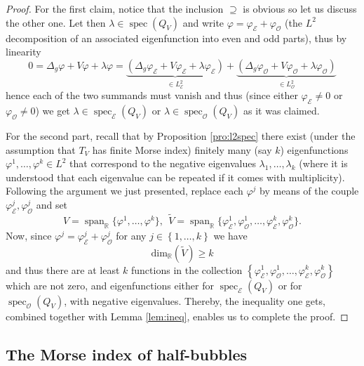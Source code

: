 \documentclass[10pt]{amsart}
\let\mathcal\mathscr
\DeclareMathOperator{\Span}{span}
\DeclareMathOperator{\spec}{spec}
\theoremstyle{definition}
\newcommand{\R}{\mathbb{R}}
\begin{document}
\begin{proof}
For the first claim, notice that the inclusion $\supseteq$ is obvious so let us discuss the other one. Let then $\lambda \in \spec(Q_V)$ and write $\varphi=\varphi_{\mathcal{E}}+\varphi_{\mathcal{O}}$ (the $L^2$ decomposition of an associated eigenfunction into even and odd parts), thus by linearity
\[
0=\Delta_g \varphi+V\varphi+\lambda\varphi= \underbrace{(\Delta_g \varphi_{\mathcal{E}}+V\varphi_{\mathcal{E}}+\lambda\varphi_{\mathcal{E}})}_{\in L^2_{\mathcal{E}} } + \underbrace{(\Delta_g \varphi_{\mathcal{O}}+V\varphi_{\mathcal{O}}+\lambda\varphi_{\mathcal{O}})}_{\in L^2_{\mathcal{O}}}
\]
hence each of the two summands must vanish and thus (since either $\varphi_{\mathcal{E}}\neq 0$ or $\varphi_{\mathcal{O}}\neq 0$) we get $\lambda\in \spec_{\mathcal{E}} (Q_V)$ or $\lambda\in \spec_{\mathcal{O}} (Q_V)$ as it was claimed.

For the second part, recall that by Proposition \ref{pro:l2spec} there exist (under the assumption that $T_V$ has finite Morse index) finitely many (say $k$) eigenfunctions $\varphi^1,\ldots,\varphi^k \in L^2$ that correspond to the negative eigenvalues $\lambda_1,\ldots,\lambda_k$ (where it is understood that each eigenvalue can be repeated if it comes with multiplicity).
Following the argument we just presented, replace each $\varphi^j$ by means of the couple $\varphi^j_{\mathcal{E}}, \varphi^j_{\mathcal{O}}$ and set
\[
V=\Span_{\R}\bigl\{\varphi^1,\ldots,\varphi^k \bigr\}, \ \ \widetilde{V}=\Span_{\R} \bigl\{\varphi^1_{\mathcal{E}}, \varphi^1_{\mathcal{O}},\ldots, \varphi^k_{\mathcal{E}}, \varphi^k_{\mathcal{O}} \bigr\}.
\]
Now, since $\varphi^j=\varphi^j_{\mathcal{E}}+\varphi^j_{\mathcal{O}}$ for any $j\in\left\{1,\ldots, k\right\}$ we have
\[
\text{dim}_{\R}(\widetilde{V})\geq k
\]
and thus there are at least $k$ functions in the collection $\left\{\varphi^1_{\mathcal{E}}, \varphi^1_{\mathcal{O}},\ldots, \varphi^k_{\mathcal{E}}, \varphi^k_{\mathcal{O}} \right\}$ which are not zero, and eigenfunctions either for $\spec_{\mathcal{E}} (Q_V)$ or for $\spec_{\mathcal{O}} (Q_V)$, with negative eigenvalues. Thereby, the inequality one gets, combined together with Lemma \ref{lem:ineq}, enables us to complete the proof.
\end{proof}

\subsection{The Morse index of half-bubbles}\label{subs:morsehalf}
\end{document}
